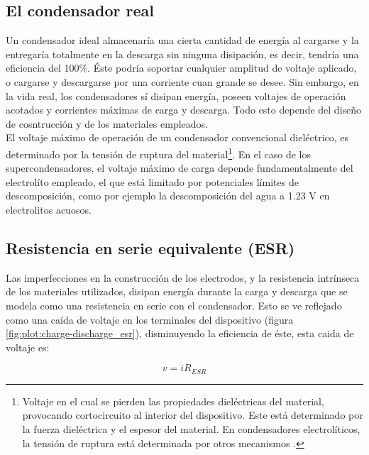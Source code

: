 \subsection{El condensador real}
Un condensador ideal almacenaría una cierta cantidad de energía al cargarse y la entregaría totalmente en la descarga sin ninguna disipación, es decir, tendría una eficiencia del 100\%. Éste podría soportar cualquier amplitud de voltaje aplicado, o cargarse y descargarse por una corriente cuan grande se desee.  Sin embargo, en la vida real, los condensadores sí disipan energía, poseen voltajes de operación acotados y corrientes máximas de carga y descarga. Todo esto depende del diseño de cosntrucción y de los materiales empleados.\\
El voltaje máximo de operación de un condensador convencional dieléctrico, es determinado por la tensión de ruptura del material\footnote{Voltaje en el cual se pierden las propiedades dieléctricas del material, provocando cortocircuito al interior del dispositivo. Este está determinado por la fuerza dieléctrica y el espesor del material. En condensadores electrolíticos, la tensión de ruptura está determinada por otros mecanismos \citep{Yahalom1971}.}. En el caso de los supercondensadores, el voltaje máximo de carga depende fundamentalmente del electrolíto empleado, el que está limitado por potenciales límites de descomposición, como por ejemplo la descomposición del agua a 1.23 V en electrolitos acuosos.\\

\subsection{Resistencia en serie equivalente (ESR)}
Las imperfecciones en la construcción de los electrodos, y la resistencia intrínseca de los materiales utilizados, disipan energía durante la carga y descarga que se modela como una resistencia en serie con el condensador. Esto se ve reflejado como una caída de voltaje en los terminales del dispositivo (figura \ref{fig:plot:charge-discharge_esr}), disminuyendo la eficiencia de éste, esta caida de voltaje es:

\begin{equation}
	v = iR_{ESR}
\end{equation}

